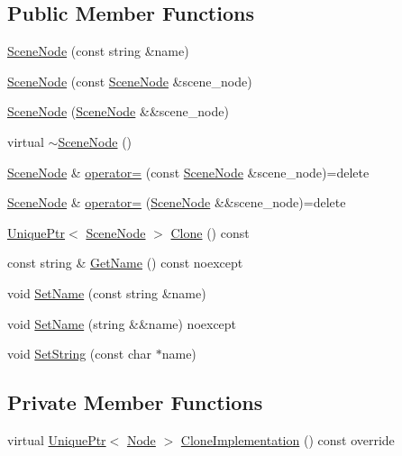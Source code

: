 \subsection*{Public Member Functions}
\begin{DoxyCompactItemize}
\item 
\hyperlink{classmage_1_1_scene_node_afc138707692a66952484ae2b3c6e15d5}{Scene\+Node} (const string \&name)
\item 
\hyperlink{classmage_1_1_scene_node_a0259a6b573eb633b589cd986b9ec6734}{Scene\+Node} (const \hyperlink{classmage_1_1_scene_node}{Scene\+Node} \&scene\+\_\+node)
\item 
\hyperlink{classmage_1_1_scene_node_acbf94ceadac62f2ccde13d70ce9298d7}{Scene\+Node} (\hyperlink{classmage_1_1_scene_node}{Scene\+Node} \&\&scene\+\_\+node)
\item 
virtual \hyperlink{classmage_1_1_scene_node_a6705beea9c535de3d495762ed06e74dd}{$\sim$\+Scene\+Node} ()
\item 
\hyperlink{classmage_1_1_scene_node}{Scene\+Node} \& \hyperlink{classmage_1_1_scene_node_af4298cbc808139f9da43055afdfe8f7e}{operator=} (const \hyperlink{classmage_1_1_scene_node}{Scene\+Node} \&scene\+\_\+node)=delete
\item 
\hyperlink{classmage_1_1_scene_node}{Scene\+Node} \& \hyperlink{classmage_1_1_scene_node_ae38092ba9ec8449f15b3c1f8285ba500}{operator=} (\hyperlink{classmage_1_1_scene_node}{Scene\+Node} \&\&scene\+\_\+node)=delete
\item 
\hyperlink{namespacemage_a3316d7143a973e37adf1110f2e80ca31}{Unique\+Ptr}$<$ \hyperlink{classmage_1_1_scene_node}{Scene\+Node} $>$ \hyperlink{classmage_1_1_scene_node_ae92f68ce03011b1c1d71421f077a00f8}{Clone} () const
\item 
const string \& \hyperlink{classmage_1_1_scene_node_ab4d72e26370747c06ccb1461f3080b31}{Get\+Name} () const noexcept
\item 
void \hyperlink{classmage_1_1_scene_node_a11a6d53a9ba637813b34347b68ad08d6}{Set\+Name} (const string \&name)
\item 
void \hyperlink{classmage_1_1_scene_node_a3dc6b033a811a9e1d6da0aa85b4f281b}{Set\+Name} (string \&\&name) noexcept
\item 
void \hyperlink{classmage_1_1_scene_node_addebab8c69bbd8a767d2f37bb2ef0ed5}{Set\+String} (const char $\ast$name)
\end{DoxyCompactItemize}
\subsection*{Private Member Functions}
\begin{DoxyCompactItemize}
\item 
virtual \hyperlink{namespacemage_a3316d7143a973e37adf1110f2e80ca31}{Unique\+Ptr}$<$ \hyperlink{classmage_1_1_node}{Node} $>$ \hyperlink{classmage_1_1_scene_node_a42d0d53ab804d38ebd584d2de6490eeb}{Clone\+Implementation} () const override
\end{DoxyCompactItemize}
